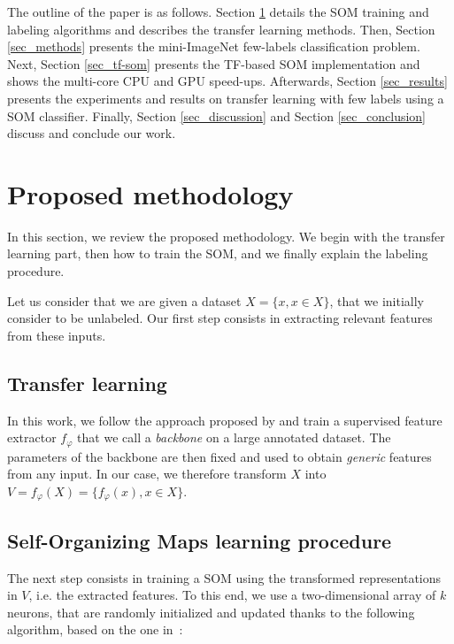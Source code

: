 \documentclass[runningheads]{llncs}
\begin{document}
The outline of the paper is as follows. Section \ref{sec_state-of-art} details the SOM training and labeling algorithms and describes the transfer learning methods. Then, Section \ref{sec_methods} presents the mini-ImageNet few-labels classification problem. Next, Section \ref{sec_tf-som} presents the TF-based SOM implementation and shows the multi-core CPU and GPU speed-ups. Afterwards, Section \ref{sec_results} presents the experiments and results on transfer learning with few labels using a SOM classifier. Finally, Section \ref{sec_discussion} and Section \ref{sec_conclusion} discuss and conclude our work.



\section{Proposed methodology}
\label{sec_state-of-art}

In this section, we review the proposed methodology. We begin with the transfer learning part, then how to train the SOM, and we finally explain the labeling procedure.

Let us consider that we are given a dataset $X = \{x, x \in X\}$, that we initially consider to be unlabeled. Our first step consists in extracting relevant features from these inputs.


\subsection{Transfer learning}

In this work, we follow the approach proposed by \cite{hu2020accurate_few_shot} and train a supervised feature extractor $f_{\varphi}$ that we call a \emph{backbone} on a large annotated dataset. The parameters of the backbone are then fixed and used to obtain \emph{generic} features from any input. In our case, we therefore transform $X$ into $V = f_{\varphi}(X) = \{f_{\varphi}(x), x\in X\}$.

\subsection{Self-Organizing Maps learning procedure}

The next step consists in training a SOM using the transformed representations in $V$, i.e. the extracted features. To this end, we use a two-dimensional array of $k$ neurons, that are randomly initialized and updated thanks to the following algorithm, based on the one in~\cite{kohonen1990som}:
\end{document}
